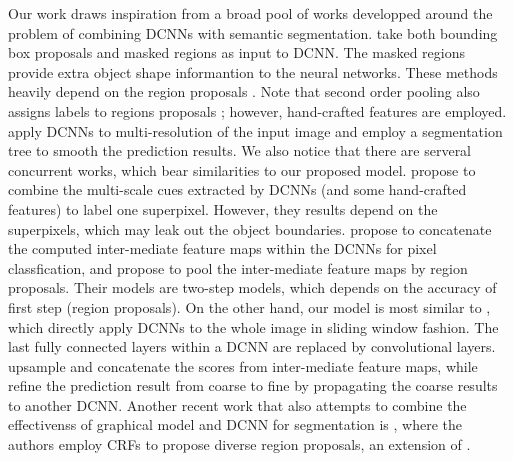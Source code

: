 Our work draws inspiration from a broad pool of works developped around the problem of combining DCNNs with semantic segmentation. 
\citet{girshick2014rcnn, hariharan2014simultaneous} take both bounding box proposals and masked regions as input to DCNN. The masked regions provide extra object shape informantion to the neural networks. These methods heavily depend on the region proposals \citep{arbelaez2014multiscale, Uijlings13}. Note that second order pooling \citep{carreira2012semantic} also assigns labels to regions proposals \citep{carreira2012cpmc}; however, hand-crafted features are employed. \citet{farabet2013learning} apply DCNNs to multi-resolution of the input image and employ a segmentation tree to smooth the prediction results. We also notice that there are serveral concurrent works, which bear similarities to our proposed model. \citet{mostajabi2014feedforward} propose to combine the multi-scale cues extracted by DCNNs (and some hand-crafted features) to label one superpixel. However, they results depend on the superpixels, which may leak out the object boundaries. \citet{hariharan2014hypercolumns} propose to concatenate the computed inter-mediate feature maps within the DCNNs for pixel classfication, and \citet{dai2014convolutional} propose to pool the inter-mediate feature maps by region proposals. Their models are two-step models, which depends on the accuracy of first step (\ie region proposals). On the other hand, our model is most similar to \citet{long2014fully, eigen2014predicting}, which directly apply DCNNs to the whole image in sliding window fashion. The last fully connected layers within a DCNN are replaced by convolutional layers. \citet{long2014fully} upsample and concatenate the scores from inter-mediate feature maps, while \citet{eigen2014predicting} refine the prediction result from coarse to fine by propagating the coarse results to another DCNN. Another recent work that also attempts to combine the effectivenss of graphical model and DCNN for segmentation is \citet{cogswell2014combining}, where the authors employ CRFs to propose diverse region proposals, an extension of \citet{yadollahpour2013discriminative}.







